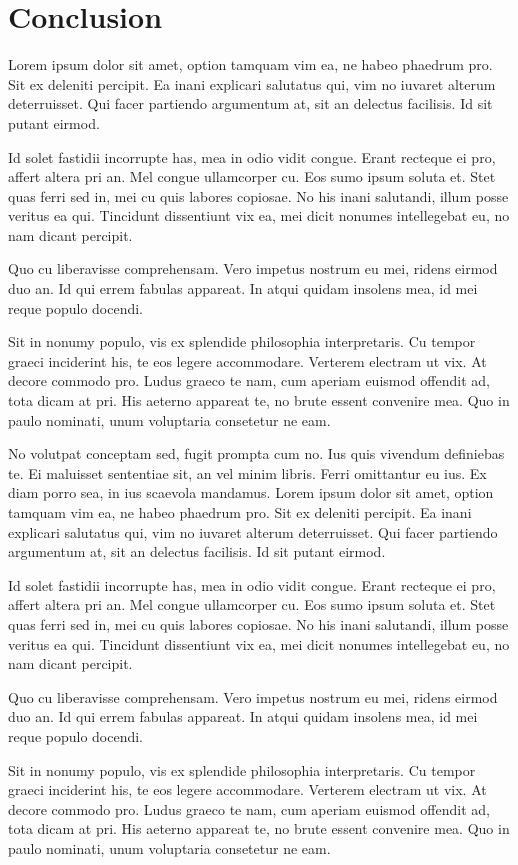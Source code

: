 \section{Conclusion}
Lorem ipsum dolor sit amet, option tamquam vim ea, ne habeo phaedrum pro. Sit ex deleniti percipit. Ea inani explicari salutatus qui, vim no iuvaret alterum deterruisset. Qui facer partiendo argumentum at, sit an delectus facilisis. Id sit putant eirmod.

Id solet fastidii incorrupte has, mea in odio vidit congue. Erant recteque ei pro, affert altera pri an. Mel congue ullamcorper cu. Eos sumo ipsum soluta et. Stet quas ferri sed in, mei cu quis labores copiosae. No his inani salutandi, illum posse veritus ea qui. Tincidunt dissentiunt vix ea, mei dicit nonumes intellegebat eu, no nam dicant percipit.

Quo cu liberavisse comprehensam. Vero impetus nostrum eu mei, ridens eirmod duo an. Id qui errem fabulas appareat. In atqui quidam insolens mea, id mei reque populo docendi.

Sit in nonumy populo, vis ex splendide philosophia interpretaris. Cu tempor graeci inciderint his, te eos legere accommodare. Verterem electram ut vix. At decore commodo pro. Ludus graeco te nam, cum aperiam euismod offendit ad, tota dicam at pri. His aeterno appareat te, no brute essent convenire mea. Quo in paulo nominati, unum voluptaria consetetur ne eam.

No volutpat conceptam sed, fugit prompta cum no. Ius quis vivendum definiebas te. Ei maluisset sententiae sit, an vel minim libris. Ferri omittantur eu ius. Ex diam porro sea, in ius scaevola mandamus.
Lorem ipsum dolor sit amet, option tamquam vim ea, ne habeo phaedrum pro. Sit ex deleniti percipit. Ea inani explicari salutatus qui, vim no iuvaret alterum deterruisset. Qui facer partiendo argumentum at, sit an delectus facilisis. Id sit putant eirmod.

Id solet fastidii incorrupte has, mea in odio vidit congue. Erant recteque ei pro, affert altera pri an. Mel congue ullamcorper cu. Eos sumo ipsum soluta et. Stet quas ferri sed in, mei cu quis labores copiosae. No his inani salutandi, illum posse veritus ea qui. Tincidunt dissentiunt vix ea, mei dicit nonumes intellegebat eu, no nam dicant percipit.

Quo cu liberavisse comprehensam. Vero impetus nostrum eu mei, ridens eirmod duo an. Id qui errem fabulas appareat. In atqui quidam insolens mea, id mei reque populo docendi.

Sit in nonumy populo, vis ex splendide philosophia interpretaris. Cu tempor graeci inciderint his, te eos legere accommodare. Verterem electram ut vix. At decore commodo pro. Ludus graeco te nam, cum aperiam euismod offendit ad, tota dicam at pri. His aeterno appareat te, no brute essent convenire mea. Quo in paulo nominati, unum voluptaria consetetur ne eam.


